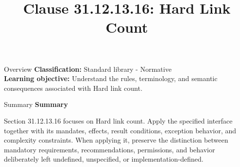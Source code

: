 \documentclass[10pt,letterpaper]{article}
\title{Clause 31.12.13.16: Hard Link Count}
\author{}
\date{}
\begin{document}
\maketitle
\begin{CornellOverviewBox}{Overview}
\textbf{Classification:} Standard library - Normative\\[2pt]
\textbf{Learning objective:} Understand the rules, terminology, and semantic consequences associated with Hard link count.
\end{CornellOverviewBox}\begin{CornellSummaryBox}{Summary}
{\sffamily\bfseries\color{Accent} Summary}\par\vspace{3pt}Section 31.12.13.16 focuses on Hard link count. Apply the specified interface together with its mandates, effects, result conditions, exception behavior, and complexity constraints. When applying it, preserve the distinction between mandatory requirements, recommendations, permissions, and behavior deliberately left undefined, unspecified, or implementation-defined.
\end{CornellSummaryBox}
\end{document}
